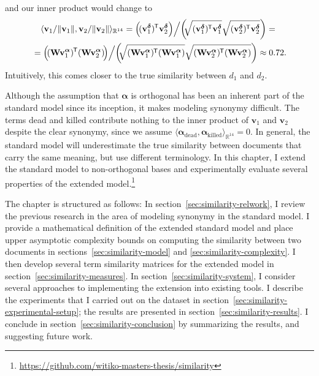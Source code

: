 \documentclass[
  digital, %
  notable, %
  lof,     %
  lot,     %
  nopalatino, color
]{fithesis3}
\newif\ifthesis\thesistrue
\newif\ifreview\reviewfalse
\newcommand*{\tran}{^{\mkern-1.5mu\mathsf{T}}}
\let\note=\footnote
\begin{document}
and our inner product would change to
\begin{multline*}
  \langle\mathbf v_1/\Vert \mathbf v_1\Vert, \mathbf v_2/\Vert\mathbf v_2\Vert\rangle_{\mathbb{R}^{14}}
  = \Big(\!(\mathbf v_1^{\bm\delta})\tran \mathbf v_2^{\bm\delta}\Big) \Big/\!
    \left(\!\!\sqrt{\mathbf (\mathbf v_1^{\bm\delta})\tran \mathbf
    v_1^{\bm\delta}}\sqrt{\mathbf (\mathbf v_2^{\bm\delta})\tran \mathbf
    v_2^{\bm\delta}}\right) ={}\\
  {}= \Big(\!(\mathbf W\mathbf v_1^{\bm\alpha})\tran (\mathbf W\mathbf v_2^{\bm\alpha})\!\Big) \Big/\!
    \left(\!\!\sqrt{\mathbf (\mathbf W\mathbf v_1^{\bm\alpha})\tran (\mathbf W\mathbf
    v_1^{\bm\alpha})}\sqrt{(\mathbf W\mathbf v_2^{\bm\alpha})\tran (\mathbf W\mathbf
    v_2^{\bm\alpha})}\right)\approx0.72.
\end{multline*}
Intuitively, this comes closer to the true similarity between $d_1$ and $d_2$.

Although the assumption that $\bm\alpha$ is orthogonal has been an inherent
part of the standard model since its inception, it makes modeling synonymy
difficult. The terms dead and killed contribute nothing to the inner product of
$\mathbf v_1$ and $\mathbf v_2$ despite the clear synonymy, since we assume
$\langle \bm\alpha_{\text{dead}}, \bm\alpha_{\text{killed}}\rangle_{\mathbb
R^{14}}=0$. In general, the standard model will underestimate the true
similarity between documents that carry the same meaning, but use different
terminology. In this \ifthesis chapter\else work\fi, I extend the standard
model to non-orthogonal bases and experimentally
evaluate several properties of the extended model.\note{%
\ifreview
A link to the research data will be disclosed in the camera-ready
version of the paper.
\else
\url{https://github.com/witiko-masters-thesis/similarity}
\fi}

The chapter is structured as follows: In section~\ref{sec:similarity-relwork}, I
review the previous research in the area of modeling synonymy in the standard
model. I provide a mathematical definition of the extended standard model and
place upper asymptotic complexity bounds on computing the similarity between two
documents in sections~\ref{sec:similarity-model} and
\ref{sec:similarity-complexity}. I then develop several term similarity matrices
for the extended model in section~\ref{sec:similarity-measures}. In
section~\ref{sec:similarity-system}, I consider several approaches to
implementing the extension into existing tools. I describe the experiments that
I carried out on the dataset in
section~\ref{sec:similarity-experimental-setup}; the results are presented in
section~\ref{sec:similarity-results}. I conclude in
section~\ref{sec:similarity-conclusion} by summarizing the results, and
suggesting future work.
\end{document}
